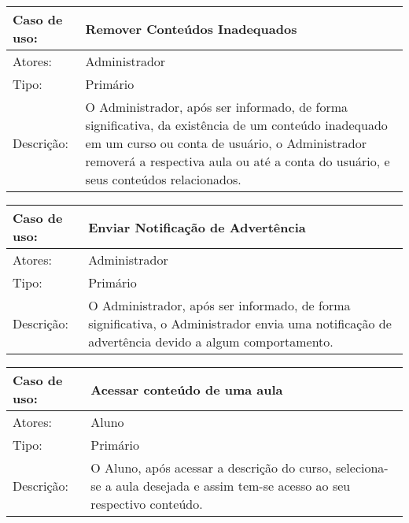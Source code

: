 \documentclass[12pt,a4paper,onecolumn,titlepage]{article}
\begin{document}
\begin{table}[h!]
\begin{center}
\begin{tabular}{p{2.5cm} p{9.5cm}}
Caso de uso: & \textbf{Remover Conteúdos Inadequados} \\ \hline
Atores: & Administrador \\ \hline
Tipo: & Primário \\ \hline
Descrição: & O Administrador, após ser informado, de forma significativa, da existência de um conteúdo inadequado em um curso ou conta de usuário, o Administrador removerá a respectiva aula ou até a conta do usuário, e seus conteúdos relacionados.

\end{tabular}
\end{center}
\end{table}

\begin{table}[h!]
\begin{center}
\begin{tabular}{p{2.5cm} p{9.5cm}}
Caso de uso: & \textbf{Enviar Notificação de Advertência} \\ \hline
Atores: & Administrador \\ \hline
Tipo: & Primário \\ \hline
Descrição: & O Administrador, após ser informado, de forma significativa, o Administrador envia uma notificação de advertência devido a algum comportamento.

\end{tabular}
\end{center}
\end{table}


\begin{table}[h!]
\begin{center}
\begin{tabular}{p{2.5cm} p{9.5cm}}
Caso de uso: & \textbf{Acessar conteúdo de uma aula} \\ \hline
Atores: & Aluno \\ \hline
Tipo: & Primário \\ \hline
Descrição: & O Aluno, após acessar a descrição do curso, seleciona-se a aula desejada e assim tem-se acesso ao seu respectivo conteúdo.

\end{tabular}
\end{center}
\end{table}
\end{document}
